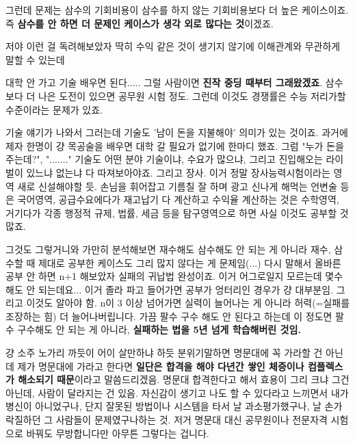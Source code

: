 그런데 문제는 삼수의 기회비용이 삼수를 하지 않는 기회비용보다 더 높은 케이스이죠.
즉 \textbf{삼수를 안 하면 더 문제인 케이스가 생각 외로 많다는 것}이겠죠.
\vspace{5mm}

저야 이런 걸 독려해보았자 딱히 수익 같은 것이 생기지 않기에 이해관계와 무관하게 말할 수 있는데
\vspace{5mm}

대학 안 가고 기술 배우면 된다..... 그럴 사람이면 \textbf{진작 중딩 때부터 그래왔겠죠}.
삼수보다 더 나은 도전이 있으면 공무원 시험 정도.
그런데 이것도 경쟁률은 수능 저리가할 수준이라는 문제가 있죠.
\vspace{5mm}

기술 얘기가 나와서 그러는데 기술도 '남이 돈을 지불해야' 의미가 있는 것이죠.
과거에 제자 한명이 걍 목공술을 배우면 대학 갈 필요가 없기에 한마디 했죠. 그럼 "누가 돈을 주는데?", "......."
기술도 어떤 분야 기술이냐, 수요가 많으냐, 그리고 진입해오는 라이벌이 있느냐 없는냐 다 따져보아야죠.
그리고 장사. 이거 정말 장사능력시험이라는 영역 새로 신설해야할 듯.
손님을 휘어잡고 기름칠 잘 하며 광고 신나게 해먹는 언변술 등은 국어영역,
공급수요에다가 재고납기 다 계산하고 수익율 계산하는 것은 수학영역,
거기다가 각종 행정적 규제, 법률, 세금 등을 탐구영역으로 하면 사실 이것도 공부할 것 많죠.
\vspace{5mm}

그것도 그렇거니와 가만히 분석해보면 재수해도 삼수해도 안 되는 게 아니라
재수, 삼수할 때 제대로 공부한 케이스도 그리 많지 않다는 게 문제임(...)
다시 말해서 올바른 공부 안 하면 n+1 해보았자 실패의 귀납법 완성이죠.
이거 어그로일지 모르는데 몇수 해도 안 되는데요... 이거 졸라 파고 들어가면 공부가 엉터리인 경우가 걍 대부분임.
그리고 이것도 알아야 함. n이 3 이상 넘어가면 실력이 늘어나는 게 아니라 허력(=실패를 조장하는 힘) 더 늘어나버립니다.
가끔 팔수 구수 해도 안 된다고 하는데 이 정도면 팔수 구수해도 안 되는 게 아니라, \textbf{실패하는 법을 5년 넘게 학습해버린 것임.}
\vspace{5mm}

걍 소주 노가리 까듯이 어이 살만하냐 하듯 분위기말하면 명문대에 꼭 가라할 건 아닌데
제가 명문대에 가라고 한다면 \textbf{일단은 합격을 해야 다년간 쌓인 체증이나 컴플렉스가 해소되기 때문}이라고 말씀드리겠음.
명문대 합격한다고 해서 효용이 그리 크냐 그건 아닌데, 사람이 달라지는 건 있음. 자신감이 생기고 나도 할 수 있다라고 느끼면서
내가 병신이 아니었구나, 단지 잘못된 방법이나 시스템을 타서 날 과소평가했구나, 날 손가락질하던 그 사람들이 문제였구나하는 것.
저거 명문대 대신 공무원이나 전문자격 시험으로 바꿔도 무방합니다만 아무튼 그렇다는 겁니다.
\vspace{5mm}

